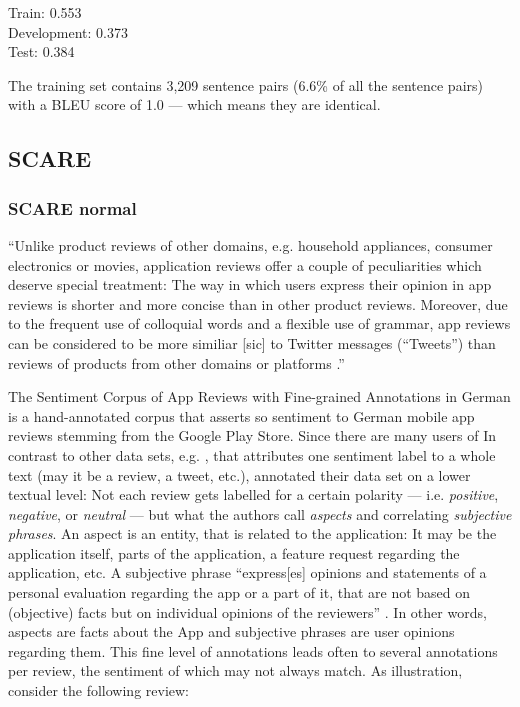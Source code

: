 Train: 0.553 \\
Development: 0.373 \\
Test: 0.384

The training set contains 3,209 sentence pairs (6.6\% of all the sentence pairs) with a BLEU score of 1.0 --- which means they are identical.

\subsection{SCARE}

\subsubsection{SCARE normal}

``Unlike product reviews of other domains, e.g. household appliances, consumer electronics or movies, application reviews offer a couple of peculiarities which deserve special treatment:
The way in which users express their opinion in app reviews is shorter and more concise than in other product reviews.
Moreover, due to the frequent use of colloquial words and a flexible use of grammar, app reviews can be considered to be more similiar [sic] to Twitter messages (“Tweets”) than reviews of products from other domains or platforms \textelp{}.'' \citep[p.~1114]{sanger2016scare}


The Sentiment Corpus of App Reviews with Fine-grained Annotations in German \cite{sanger2016scare} is a hand-annotated corpus that asserts so sentiment to German mobile app reviews stemming from the Google Play Store.
Since there are many users of 
In contrast to other data sets, e.g. \citep{socher2013recursive, go2009twitter}, that attributes one sentiment label to a whole text (may it be a review, a tweet, etc.), \cite{sanger2016scare} annotated their data set on a lower textual level:
Not each review gets labelled for a certain polarity --- i.e. \emph{positive}, \emph{negative}, or \emph{neutral} --- but what the authors call \emph{aspects} and correlating \emph{subjective phrases}.
An aspect is an entity, that is related to the application:
It may be the application itself, parts of the application, a feature request regarding the application, etc.
A subjective phrase ``express[es] opinions and statements of a personal evaluation regarding the app or a part of it, that are not based on (objective) facts but on individual opinions of the reviewers'' \citep[p.~1116]{sanger2016scare}.
In other words, aspects are facts about the App and subjective phrases are user opinions regarding them.
This fine level of annotations leads often to several annotations per review, the sentiment of which may not always match.
As illustration, consider the following review:

